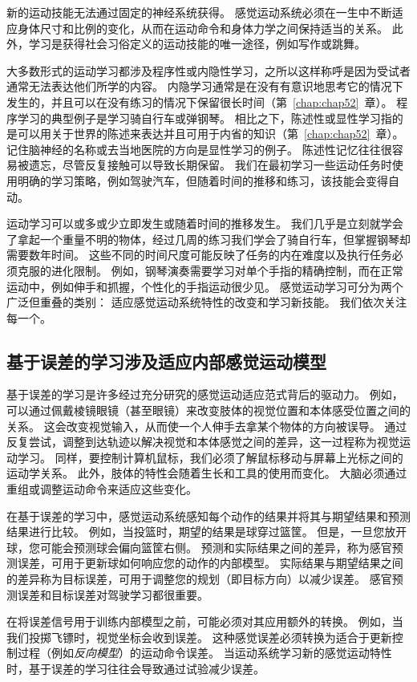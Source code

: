 新的运动技能无法通过固定的神经系统获得。
感觉运动系统必须在一生中不断适应身体尺寸和比例的变化，从而在运动命令和身体力学之间保持适当的关系。
此外，学习是获得社会习俗定义的运动技能的唯一途径，例如写作或跳舞。


大多数形式的运动学习都涉及程序性或内隐性学习，之所以这样称呼是因为受试者通常无法表达他们所学的内容。
内隐学习通常是在没有有意识地思考它的情况下发生的，并且可以在没有练习的情况下保留很长时间（第~\ref{chap:chap52}~章）。
程序学习的典型例子是学习骑自行车或弹钢琴。 相比之下，陈述性或显性学习指的是可以用关于世界的陈述来表达并且可用于内省的知识（第~\ref{chap:chap52}~章）。
记住脑神经的名称或去当地医院的方向是显性学习的例子。
陈述性记忆往往很容易被遗忘，尽管反复接触可以导致长期保留。
我们在最初学习一些运动任务时使用明确的学习策略，例如驾驶汽车，但随着时间的推移和练习，该技能会变得自动。


运动学习可以或多或少立即发生或随着时间的推移发生。
我们几乎是立刻就学会了拿起一个重量不明的物体，经过几周的练习我们学会了骑自行车，但掌握钢琴却需要数年时间。
这些不同的时间尺度可能反映了任务的内在难度以及执行任务必须克服的进化限制。
例如，钢琴演奏需要学习对单个手指的精确控制，而在正常运动中，例如伸手和抓握，个性化的手指运动很少见。
感觉运动学习可分为两个广泛但重叠的类别：
适应感觉运动系统特性的改变和学习新技能。
我们依次关注每一个。



\subsection{基于误差的学习涉及适应内部感觉运动模型}

基于误差的学习是许多经过充分研究的感觉运动适应范式背后的驱动力。
例如，可以通过佩戴棱镜眼镜（甚至眼镜）来改变肢体的视觉位置和本体感受位置之间的关系。
这会改变视觉输入，从而使一个人伸手去拿某个物体的方向被误导。
通过反复尝试，调整到达轨迹以解决视觉和本体感觉之间的差异，这一过程称为视觉运动学习。
同样，要控制计算机鼠标，我们必须了解鼠标移动与屏幕上光标之间的运动学关系。
此外，肢体的特性会随着生长和工具的使用而变化。
大脑必须通过重组或调整运动命令来适应这些变化。


在基于误差的学习中，感觉运动系统感知每个动作的结果并将其与期望结果和预测结果进行比较。
例如，当投篮时，期望的结果是球穿过篮筐。
但是，一旦您放开球，您可能会预测球会偏向篮筐右侧。
预测和实际结果之间的差异，称为感官预测误差，可用于更新球如何响应您的动作的内部模型。
实际结果与期望结果之间的差异称为目标误差，可用于调整您的规划（即目标方向）以减少误差。
感官预测误差和目标误差对驾驶学习都很重要。


在将误差信号用于训练内部模型之前，可能必须对其应用额外的转换。
例如，当我们投掷飞镖时，视觉坐标会收到误差。
这种感觉误差必须转换为适合于更新控制过程（例如\textit{反向模型}）的运动命令误差。
当运动系统学习新的感觉运动特性时，基于误差的学习往往会导致通过试验减少误差。


